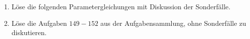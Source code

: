 \documentclass[11pt,oneside]{article}
\begin{document}
	\begin{aufgabe}
		\begin{enumerate}
			\item Löse die folgenden Parametergleichungen mit Diskussion der Sonderfälle.
			\item Löse die Aufgaben $149-152$ aus der Aufgabensammlung, ohne Sonderfälle zu diskutieren.
		\end{enumerate}
	\end{aufgabe}
\end{document}

